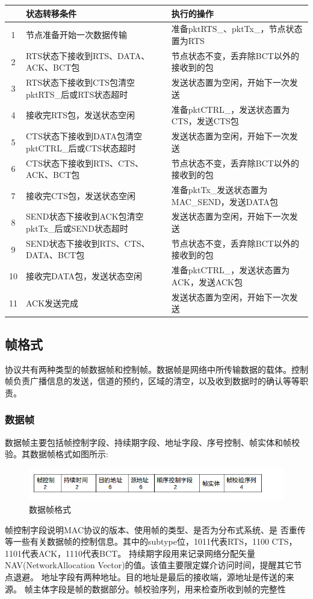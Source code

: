 \begin{table}[!ht]
	\centering
	\begin{tabular}{c p{7cm} p{8cm} }
		\hline  %
		&状态转移条件&执行的操作\\
		\hline  %
		1&节点准备开始一次数据传输 &准备pktRTS\_、pktTx\_，节点状态置为RTS\\
		2&RTS状态下接收到RTS、DATA、ACK、BCT包&节点状态不变，丢弃除BCT以外的接收到的包\\
		3&RTS状态下接收到CTS包清空pktRTS\_后或RTS状态超时&发送状态置为空闲，开始下一次发送\\
		4&接收完RTS包，发送状态空闲&准备pktCTRL\_，发送状态置为CTS，发送CTS包\\
		5&CTS状态下接收到DATA包清空pktCTRL\_后或CTS状态超时&发送状态置为空闲，开始下一次发送\\
		6&CTS状态下接收到RTS、CTS、ACK、BCT包&节点状态不变，丢弃除BCT以外的接收到的包\\
		7&接收完CTS包，发送状态空闲&准备pktTx\_发送状态置为MAC\_SEND，发送DATA包\\
		8&SEND状态下接收到ACK包清空pktTx\_后或SEND状态超时&发送状态置为空闲，开始下一次发送\\
		9&SEND状态下接收到RTS、CTS、DATA、BCT包&节点状态不变，丢弃除BCT以外的接收到的包\\
		10&接收完DATA包，发送状态空闲&准备pktCTRL\_，发送状态置为ACK，发送ACK包\\
		11&ACK发送完成&发送状态置为空闲，开始下一次发送\\
		\hline
	\end{tabular}
\end{table}

\subsection{帧格式}
协议共有两种类型的帧数据帧和控制帧。数据帧是网络中所传输数据的载体。控制帧负责广播信息的发送，信道的预约，区域的清空，以及收到数据时的确认等等职责。
\subsubsection{数据帧}
数据帧主要包括帧控制字段、持续期字段、地址字段、序号控制、帧实体和帧校验。其数据帧格式如图所示:
\begin{figure}[!ht]
	\centering
	\includegraphics[scale=0.5]{figures/data.png}
	\caption{
		数据帧格式
	}
	\label{fig:example}
\end{figure}
帧控制字段说明MAC协议的版本、使用帧的类型、是否为分布式系统、是
否重传等一些有关数据帧的控制信息。其中的subtype位，1011代表RTS，1100 CTS，1101代表ACK，1110代表BCT。
持续期字段用来记录网络分配矢量NAV(NetworkAllocation Vector)的值。该值主要限定媒介访问时间，提醒其它节点退避。
地址字段有两种地址。目的地址是最后的接收端，源地址是传送的来源。
帧主体字段是帧的数据部分。帧校验序列，用来检查所收到帧的完整性

